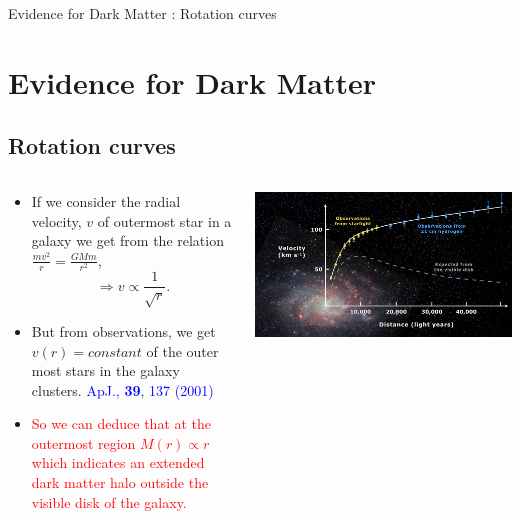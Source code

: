 \documentclass[11pt]{beamer}
\begin{document}
\begin{frame}{Evidence for Dark Matter : Rotation curves}
\section{Evidence for Dark Matter}

\subsection{Rotation curves}
\begin{small}
\begin{columns}

\begin{column}{0.6\textwidth}



\begin{itemize}
\item If we consider the radial velocity, $v$ of outermost star in a galaxy we get from the relation $\frac{mv^2}{r}= \frac{GMm}{r^2}$,
$$\Rightarrow  v\propto \frac{1}{\sqrt{r}}.$$
\vspace{-0.5cm}
  
\item But from observations, we get $v(r)= constant$ of the outer most stars in the galaxy clusters. \textcolor{blue}{\tiny{ApJ., {\bf 39}, 137 (2001) }}
\item \textcolor{red}{So we can deduce that at the outermost region $M(r) \propto r$ which indicates an extended dark matter halo outside the visible disk of the galaxy.}
\end{itemize}

\end{column}

\begin{column}{0.5\textwidth}
\includegraphics[scale=0.08]{R.png}
\end{column}


\end{columns}
\end{small}
\end{frame}
\end{document}

